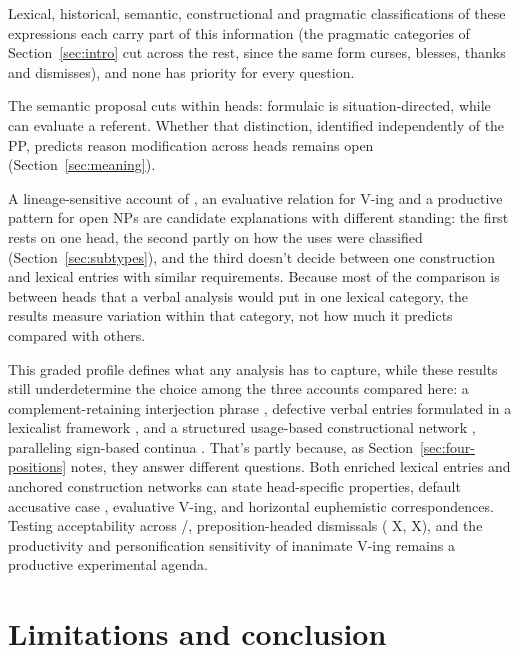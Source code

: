 \documentclass[12pt]{article}
\begin{document}
Lexical, historical, semantic, constructional and pragmatic classifications of these expressions each carry part of this information (the pragmatic categories of Section~\ref{sec:intro} cut across the rest, since the same form curses, blesses, thanks and dismisses), and none has priority for every question.

The semantic proposal cuts within heads: formulaic  is situation-directed, while  can evaluate a referent. Whether that distinction, identified independently of the PP, predicts reason modification across heads remains open (Section~\ref{sec:meaning}).

A lineage-sensitive account of , an evaluative relation for  V-ing and a productive pattern for open NPs are candidate explanations with different standing: the first rests on one head, the second partly on how the uses were classified (Section~\ref{sec:subtypes}), and the third doesn't decide between one construction and lexical entries with similar requirements. Because most of the comparison is between heads that a verbal analysis would put in one lexical category, the results measure variation within that category, not how much it predicts compared with others.

This graded profile defines what any analysis has to capture, while these results still underdetermine the choice among the three accounts compared here: a complement-retaining interjection phrase \citep[1361 n.\ 70]{huddleston2002}, defective verbal entries formulated in a lexicalist framework \citep{mullerwechsler2014}, and a structured usage-based constructional network \citep{goldberg2003,goldberg2019,croft2001,bybee2010,diessel2019,schmid2020}, paralleling sign-based continua \citep{sag2012sign}. That's partly because, as Section~\ref{sec:four-positions} notes, they answer different questions. Both enriched lexical entries and anchored construction networks can state head-specific properties, default accusative case \citep{schutze2001}, evaluative  V-ing, and horizontal euphemistic correspondences. Testing acceptability across /, preposition-headed dismissals ( X,  X), and the productivity and personification sensitivity of inanimate  V-ing remains a productive experimental agenda.

\section{Limitations and conclusion}
\label{sec:conclusion}
\end{document}
